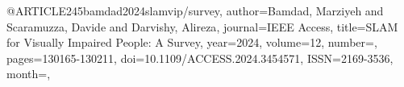 @ARTICLE{245bamdad2024slamvip/survey,
author={Bamdad, Marziyeh and Scaramuzza, Davide and Darvishy, Alireza},
journal={IEEE Access}, 
title={SLAM for Visually Impaired People: A Survey}, 
year={2024},
volume={12},
number={},
pages={130165-130211},
doi={10.1109/ACCESS.2024.3454571},
ISSN={2169-3536},
month={},}
